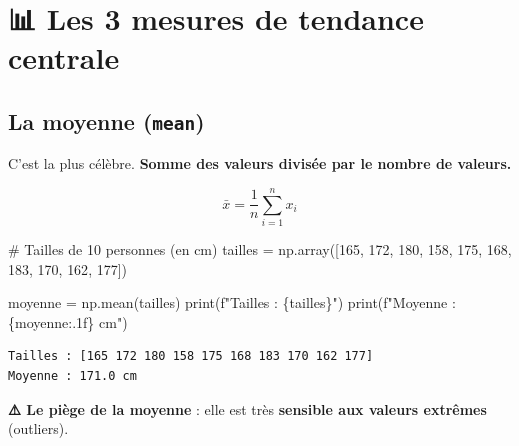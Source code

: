 \documentclass[
  french,
  11pt,
  a4paper,
]{scrbook}
\newenvironment{Shaded}{}{}
\newcommand{\BuiltInTok}[1]{\textcolor[rgb]{0.84,0.23,0.29}{#1}}
\newcommand{\CommentTok}[1]{\textcolor[rgb]{0.42,0.45,0.49}{#1}}
\newcommand{\DecValTok}[1]{\textcolor[rgb]{0.00,0.36,0.77}{#1}}
\newcommand{\NormalTok}[1]{\textcolor[rgb]{0.14,0.16,0.18}{#1}}
\newcommand{\OperatorTok}[1]{\textcolor[rgb]{0.14,0.16,0.18}{#1}}
\newcommand{\SpecialCharTok}[1]{\textcolor[rgb]{0.00,0.36,0.77}{#1}}
\newcommand{\SpecialStringTok}[1]{\textcolor[rgb]{0.01,0.18,0.38}{#1}}
\begin{document}
\section{📊 Les 3 mesures de tendance
centrale}\label{les-3-mesures-de-tendance-centrale}

\subsection{\texorpdfstring{La moyenne
(\texttt{mean})}{La moyenne (mean)}}\label{la-moyenne-mean}

C'est la plus célèbre. \textbf{Somme des valeurs divisée par le nombre
de valeurs.}

\[\bar{x} = \frac{1}{n} \sum_{i=1}^{n} x_i\]

\begin{Shaded}
\begin{Highlighting}[]
\CommentTok{\# Tailles de 10 personnes (en cm)}
\NormalTok{tailles }\OperatorTok{=}\NormalTok{ np.array([}\DecValTok{165}\NormalTok{, }\DecValTok{172}\NormalTok{, }\DecValTok{180}\NormalTok{, }\DecValTok{158}\NormalTok{, }\DecValTok{175}\NormalTok{, }\DecValTok{168}\NormalTok{, }\DecValTok{183}\NormalTok{, }\DecValTok{170}\NormalTok{, }\DecValTok{162}\NormalTok{, }\DecValTok{177}\NormalTok{])}

\NormalTok{moyenne }\OperatorTok{=}\NormalTok{ np.mean(tailles)}
\BuiltInTok{print}\NormalTok{(}\SpecialStringTok{f"Tailles : }\SpecialCharTok{\{}\NormalTok{tailles}\SpecialCharTok{\}}\SpecialStringTok{"}\NormalTok{)}
\BuiltInTok{print}\NormalTok{(}\SpecialStringTok{f"Moyenne : }\SpecialCharTok{\{}\NormalTok{moyenne}\SpecialCharTok{:.1f\}}\SpecialStringTok{ cm"}\NormalTok{)}
\end{Highlighting}
\end{Shaded}

\begin{verbatim}
Tailles : [165 172 180 158 175 168 183 170 162 177]
Moyenne : 171.0 cm
\end{verbatim}

\textbf{⚠️ Le piège de la moyenne} : elle est très \textbf{sensible aux
valeurs extrêmes} (outliers).
\end{document}
